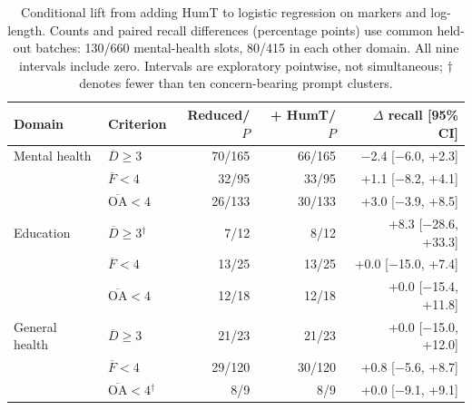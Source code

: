 \begin{table}[htbp]
\centering\small
\caption{Conditional lift from adding HumT to logistic regression on markers and log-length. Counts and paired recall differences (percentage points) use common held-out batches: 130/660 mental-health slots, 80/415 in each other domain. All nine intervals include zero. Intervals are exploratory pointwise, not simultaneous; $\dagger$ denotes fewer than ten concern-bearing prompt clusters.}
\label{tab:conditional}
\begin{tabular}{llrrr}
\toprule
Domain & Criterion & Reduced/$P$ & + HumT/$P$ & $\Delta$ recall [95\% CI] \\
\midrule
Mental health & $\overline D\geq3$ & 70/165 & 66/165 & \ensuremath{-}2.4 [\ensuremath{-}6.0, +2.3] \\
 & $\overline F<4$ & 32/95 & 33/95 & +1.1 [\ensuremath{-}8.2, +4.1] \\
 & $\overline{\mathrm{OA}}<4$ & 26/133 & 30/133 & +3.0 [\ensuremath{-}3.9, +8.5] \\
Education & $\overline D\geq3$$^{\dagger}$ & 7/12 & 8/12 & +8.3 [\ensuremath{-}28.6, +33.3] \\
 & $\overline F<4$ & 13/25 & 13/25 & +0.0 [\ensuremath{-}15.0, +7.4] \\
 & $\overline{\mathrm{OA}}<4$ & 12/18 & 12/18 & +0.0 [\ensuremath{-}15.4, +11.8] \\
General health & $\overline D\geq3$ & 21/23 & 21/23 & +0.0 [\ensuremath{-}15.0, +12.0] \\
 & $\overline F<4$ & 29/120 & 30/120 & +0.8 [\ensuremath{-}5.6, +8.7] \\
 & $\overline{\mathrm{OA}}<4$$^{\dagger}$ & 8/9 & 8/9 & +0.0 [\ensuremath{-}9.1, +9.1] \\
\bottomrule
\end{tabular}
\end{table}
